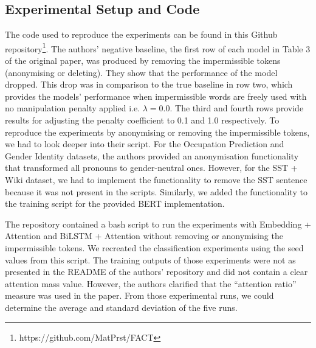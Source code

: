 
\subsection{Experimental Setup and Code}
The code used to reproduce the experiments can be found in this Github repository\footnote{https://github.com/MatPrst/FACT}. The authors' negative baseline, the first row of each model in Table 3 of the original paper, was produced by removing the impermissible tokens (anonymising or deleting). They show that the performance of the model dropped. This drop was in comparison to the true baseline in row two, which provides the models' performance when impermissible words are freely used with no manipulation penalty applied i.e. $\lambda=0.0$. The third and fourth rows provide results for adjusting the penalty coefficient to 0.1 and 1.0 respectively. To reproduce the experiments by anonymising or removing the impermissible tokens, we had to look deeper into their script. For the Occupation Prediction and Gender Identity datasets, the authors provided an anonymisation functionality that transformed all pronouns to gender-neutral ones. However, for the SST + Wiki dataset, we had to implement the functionality to remove the SST sentence because it was not present in the scripts. Similarly, we added the functionality to the training script for the provided BERT implementation.

The repository contained a bash script to run the experiments with Embedding + Attention and BiLSTM + Attention without removing or anonymising the impermissible tokens. We recreated the classification experiments using the seed values from this script. The training outputs of those experiments were not as presented in the README of the authors' repository and did not contain a clear attention mass value. However, the authors clarified that the ``attention ratio'' measure was used in the paper. From those experimental runs, we could determine the average and standard deviation of the five runs.


